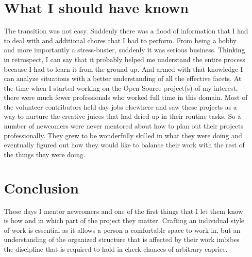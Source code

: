 \section*{What I should have known}

The transition was not easy. Suddenly there was a flood of information that I
had to deal with and additional chores that I had to perform. From being a hobby
and more importantly a stress-buster, suddenly it was serious business. Thinking
in retrospect, I can say that it probably helped me understand the entire
process because I had to learn it from the ground up. And armed with that knowledge
I can analyze situations with a better understanding of all the effective
facets. At the time when I started working on the Open Source project(s) of my
interest, there were much fewer professionals who worked full time in this
domain. Most of the volunteer contributors held day jobs elsewhere and saw these
projects as a way to nurture the creative juices that had dried up in their
routine tasks. So a number of newcomers were never mentored about how to plan
out their projects professionally. They grew to be wonderfully skilled in what
they were doing and eventually figured out how they would like to balance their work
with the rest of the things they were doing.

\section*{Conclusion}

These days I mentor newcomers and one of the first things that I let them know
is how and in which part of the project they matter. Crafting an individual
style of work is essential as it allows a person a comfortable space to work in,
but an understanding of the organized structure that is affected by their work
imbibes the discipline that is required to hold in check chances of arbitrary
caprice.
